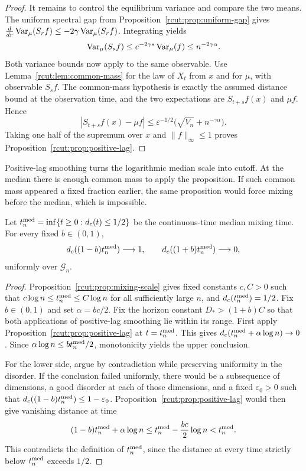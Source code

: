 \begin{proof}
It remains to control the equilibrium variance and compare the two
means.  The uniform spectral gap from
Proposition~\ref{rcut:prop:uniform-gap} gives $\frac{d}{dr}\operatorname{Var}_\mu(S_rf)\le-2\gamma\operatorname{Var}_\mu(S_rf)$.
Integrating yields
\begin{equation}
 \operatorname{Var}_\mu(S_sf)\le e^{-2\gamma s}\operatorname{Var}_\mu(f)
                        \le n^{-2\gamma\alpha}.
 \label{rcut:eq:cutoff-equilibrium-smoothing}
\end{equation}
Both variance bounds now apply to the same observable.  Use
Lemma~\ref{rcut:lem:common-mass} for the law of $X_t$ from $x$ and
for $\mu$, with observable $S_sf$.  The common-mass hypothesis is
exactly the assumed distance bound at the observation time, and the
two expectations are $S_{t+s}f(x)$ and $\mu f$.  Hence
\[
 |S_{t+s}f(x)-\mu f|
 \le \varepsilon^{-1/2}
          \bigl(\sqrt{V_n}+n^{-\gamma\alpha}\bigr).
\]
Taking one half of the supremum over $x$ and $\|f\|_\infty\le1$
proves Proposition~\ref{rcut:prop:positive-lag}.
\end{proof}

Positive-lag smoothing turns the logarithmic median scale into cutoff.
At the median there is enough common mass to apply the proposition.
If such common mass appeared a fixed fraction earlier, the same
proposition would force mixing before the median, which is impossible.

\begin{theorem}
\label{rcut:thm:continuous-cutoff}
Let $t_n^{\rm med}=\inf\{t\ge0:d_c(t)\le1/2\}$ be the continuous-time median
mixing time.  For every fixed $b\in(0,1)$,
\begin{equation}
 d_c((1-b)t_n^{\rm med})\longrightarrow1,
 \qquad d_c((1+b)t_n^{\rm med})\longrightarrow0,
 \label{rcut:eq:continuous-cutoff-sides}
\end{equation}
uniformly over $\mathcal G_n$.
\end{theorem}

\begin{proof}
Proposition~\ref{rcut:prop:mixing-scale} gives fixed constants $c,C>0$
such that $c\log n\le t_n^{\rm med}\le C\log n$ for all sufficiently large $n$,
and $d_c(t_n^{\rm med})=1/2$.  Fix $b\in(0,1)$ and set $\alpha=bc/2$.
Fix the horizon constant $D_*>(1+b)C$ so that both applications of
positive-lag smoothing lie within its range.  First apply
Proposition~\ref{rcut:prop:positive-lag} at $t=t_n^{\rm med}$.  This gives
$d_c(t_n^{\rm med}+\alpha\log n)\to0$.  Since
$\alpha\log n\le bt_n^{\rm med}/2$, monotonicity yields the upper conclusion.

For the lower side, argue by contradiction while preserving uniformity
in the disorder.  If the conclusion failed uniformly, there would be a subsequence
of dimensions, a good disorder at each of those dimensions, and a
fixed $\varepsilon_0>0$ such that
$d_c((1-b)t_n^{\rm med})\le1-\varepsilon_0$.  Proposition~\ref{rcut:prop:positive-lag}
would then give vanishing distance at time
\[
 (1-b)t_n^{\rm med}+\alpha\log n
 \le t_n^{\rm med}-\frac{bc}{2}\log n<t_n^{\rm med}.
\]
This contradicts the definition of $t_n^{\rm med}$, since the distance at every
time strictly below $t_n^{\rm med}$ exceeds $1/2$.
\end{proof}

